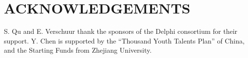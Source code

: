 \section{ACKNOWLEDGEMENTS}
S. Qu and E. Verschuur thank the sponsors of the Delphi consortium for their support. Y. Chen is supported by the “Thousand Youth Talents Plan” of China, and the Starting Funds from Zhejiang University.


%

